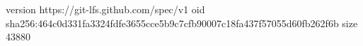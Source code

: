 version https://git-lfs.github.com/spec/v1
oid sha256:464c0d331fa3324fdfe3655cce5b9c7cfb90007c18fa437f57055d60fb262f6b
size 43880
